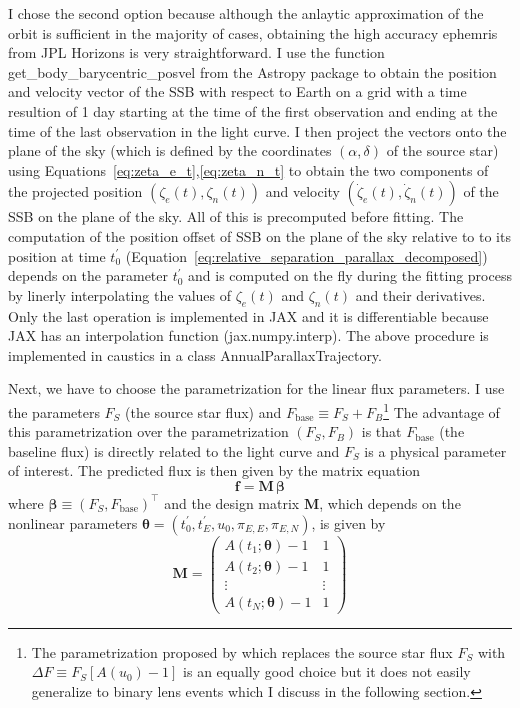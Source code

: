 \documentclass[12pt,dvipsnames]{report}
\newcommand{\ssf}[1]{\textsf{#1}}
\renewcommand{\vec}[1]{\boldsymbol{\mathbf{#1}}}
\begin{document}
I chose the second option because although the anlaytic approximation of the orbit 
is sufficient in the majority of cases, obtaining the high accuracy ephemris from 
\ssf{JPL Horizons} is very straightforward. I use the function 
\ssf{get\_body\_barycentric\_posvel} from the \ssf{Astropy} package to obtain the 
position and velocity vector of the SSB with respect to Earth on a grid with a time resultion of 
1 day starting at the time of the first observation and ending at the time of the
last observation in the light curve. I then project the vectors onto the plane of 
the sky (which is defined by the coordinates $(\alpha, \delta)$ of the source star) 
using Equations~\ref{eq:zeta_e_t},\ref{eq:zeta_n_t} to obtain the two components 
of the projected position $(\zeta_e(t), \zeta_n(t))$  and velocity 
$(\dot\zeta_e(t), \dot\zeta_n(t))$ of the SSB on the plane of the sky. All of this 
is precomputed before fitting. The computation of the position offset of SSB on the 
plane of the sky relative to to its position at time $t_0^\prime$ 
(Equation~\ref{eq:relative_separation_parallax_decomposed}) depends on the parameter
$t_0^\prime$ and is computed on the fly during the fitting process by linerly
interpolating the values of $\zeta_e(t)$ and $\zeta_n(t)$ and their derivatives. 
Only the last operation is implemented in \ssf{JAX} and it is differentiable because
\ssf{JAX} has an interpolation function (\ssf{jax.numpy.interp}).
The above procedure is implemented in \ssf{caustics} in a class 
\ssf{AnnualParallaxTrajectory}.

Next, we have to choose the parametrization for the linear flux parameters. 
I use the parameters $F_S$ (the source star flux) and 
$F_\mathrm{base}\equiv F_S + F_B$\footnote{The parametrization proposed by 
\citet{2009MNRAS.393..816D} which replaces the source star flux $F_S$ with 
$\Delta F\equiv F_S\left[A(u_0)-1\right]$ is an equally good choice but it does not
easily generalize to binary lens events which I discuss in the following section.}
The advantage of this parametrization over the parametrization $(F_S,F_B)$ is that 
$F_\mathrm{base}$ (the baseline flux) is directly related to the light curve and  
$F_S$ is a physical parameter of interest. 
The predicted flux is then given by the matrix equation
\begin{equation}
    \vec f =\vec M \,\vec \beta 
\end{equation}
where $\vec \beta \equiv (F_S, F_\mathrm{base})^\intercal$ and 
the design matrix $\vec M$, which depends on the nonlinear parameters
$\vec\theta = (t_0^\prime, t_E^\prime, u_0, \pi_{E,E}, \pi_{E,N})$, is given by
\begin{equation}
    \vec M = \begin{pmatrix} 
        A(t_1;\vec\theta) - 1 & 1 \\ 
        A(t_2;\vec\theta) - 1& 1 \\ 
        \vdots & \vdots \\ 
        A(t_N;\vec\theta) - 1 & 1
    \end{pmatrix}
\end{equation}
\end{document}
